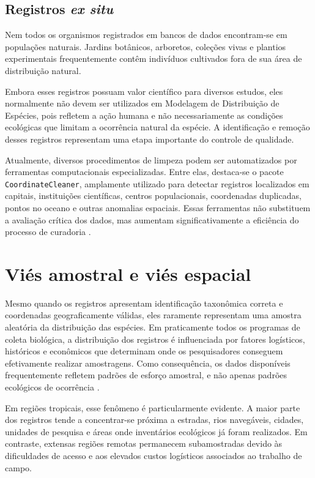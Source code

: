 \subsection{Registros \textit{ex situ}}

Nem todos os organismos registrados em bancos de dados encontram-se em populações naturais. Jardins botânicos, arboretos, coleções vivas e plantios experimentais frequentemente contêm indivíduos cultivados fora de sua área de distribuição natural.

Embora esses registros possuam valor científico para diversos estudos, eles normalmente não devem ser utilizados em Modelagem de Distribuição de Espécies, pois refletem a ação humana e não necessariamente as condições ecológicas que limitam a ocorrência natural da espécie. A identificação e remoção desses registros representam uma etapa importante do controle de qualidade.

Atualmente, diversos procedimentos de limpeza podem ser automatizados por ferramentas computacionais especializadas. Entre elas, destaca-se o pacote \texttt{CoordinateCleaner}, amplamente utilizado para detectar registros localizados em capitais, instituições científicas, centros populacionais, coordenadas duplicadas, pontos no oceano e outras anomalias espaciais. Essas ferramentas não substituem a avaliação crítica dos dados, mas aumentam significativamente a eficiência do processo de curadoria \parencite{zizka2019coordinatecleaner}.

\section{Viés amostral e viés espacial}

Mesmo quando os registros apresentam identificação taxonômica correta e coordenadas geograficamente válidas, eles raramente representam uma amostra aleatória da distribuição das espécies. Em praticamente todos os programas de coleta biológica, a distribuição dos registros é influenciada por fatores logísticos, históricos e econômicos que determinam onde os pesquisadores conseguem efetivamente realizar amostragens. Como consequência, os dados disponíveis frequentemente refletem padrões de esforço amostral, e não apenas padrões ecológicos de ocorrência \parencite{phillips2009sample,guisan2017habitat}.

Em regiões tropicais, esse fenômeno é particularmente evidente. A maior parte dos registros tende a concentrar-se próxima a estradas, rios navegáveis, cidades, unidades de pesquisa e áreas onde inventários ecológicos já foram realizados. Em contraste, extensas regiões remotas permanecem subamostradas devido às dificuldades de acesso e aos elevados custos logísticos associados ao trabalho de campo.

